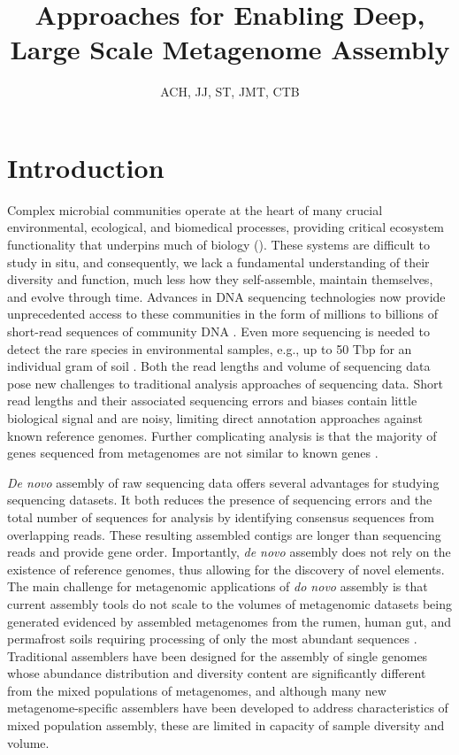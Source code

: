 \documentclass[11pt]{article} %
\begin{document}
\title{Approaches for Enabling Deep, Large Scale Metagenome Assembly}
\author{ACH, JJ, ST, JMT, CTB}
\maketitle

\section{Introduction}  
Complex microbial communities operate at the heart of many crucial environmental, ecological, and biomedical processes, providing critical ecosystem functionality that underpins much of biology (\cite{Arumugam:2011p735,Hess:2011p686,Iverson:2012p1281,Mackelprang:2011p1087,Qin:2010p189,Tringe:2005p174,Venter:2004p170}).  These systems are difficult to study in situ, and consequently, we lack a fundamental understanding of their diversity and function, much less how they self-assemble, maintain themselves, and evolve through time.  Advances in DNA sequencing technologies now provide unprecedented access to these communities in the form of millions to billions of short-read sequences of community DNA  \cite{Hess:2011p686,Mackelprang:2011p1087,Qin:2010p189}.   Even more sequencing is needed to detect the rare species in environmental samples, e.g., up to 50 Tbp for an individual gram of soil \cite{Gans:2005p1365}.   Both the read lengths and volume of sequencing data pose new challenges to traditional analysis approaches of sequencing data.  Short read lengths and their associated sequencing errors and biases contain little biological signal and are noisy, limiting direct annotation approaches against known reference genomes.  Further complicating analysis is that the majority of genes sequenced from metagenomes are not similar to known genes \cite{Arumugam:2011p735,Qin:2010p189}.  

\emph{De novo} assembly of raw sequencing data offers several advantages for studying  sequencing datasets.  It both reduces the presence  of sequencing errors and the total number of sequences for analysis by identifying consensus sequences from overlapping reads.  These resulting assembled contigs are longer than sequencing reads and provide gene order.  Importantly, \emph{de novo} assembly does not rely on the existence of reference genomes, thus allowing for the discovery of novel elements.   The main challenge for metagenomic applications of \emph{do novo} assembly is that current assembly tools do not scale to the volumes of metagenomic datasets being generated evidenced by assembled metagenomes from the rumen, human gut, and permafrost soils requiring processing of only the most abundant sequences  \cite{Hess:2011p686,Mackelprang:2011p1087,Qin:2010p189}.  Traditional assemblers have been designed for the assembly of single genomes whose abundance distribution and diversity content are significantly different from the mixed populations of metagenomes, and although many new metagenome-specific assemblers have been developed to address characteristics of mixed population assembly, these are limited in capacity of sample diversity and volume.    
\end{document}
